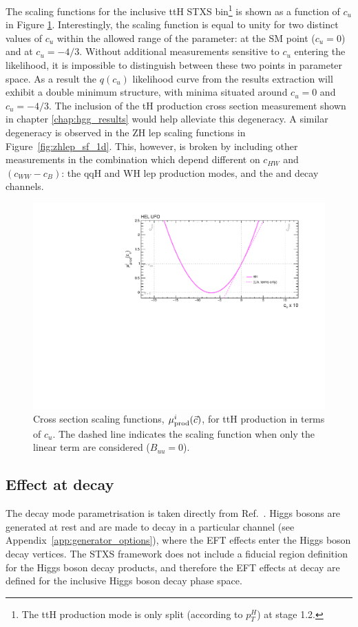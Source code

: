 The scaling functions for the inclusive ttH STXS bin\footnote{The ttH production mode is only split (according to $p_T^H$) at stage 1.2.} is shown as a function of $c_u$ in Figure \ref{fig:tth_sf_1d}. Interestingly, the scaling function is equal to unity for two distinct values of $c_u$ within the allowed range of the parameter: at the SM point ($c_u=0$) and at $c_u=-4/3$. Without additional measurements sensitive to $c_u$ entering the likelihood, it is impossible to distinguish between these two points in parameter space. As a result the $q(c_u)$ likelihood curve from the results extraction will exhibit a double minimum structure, with minima situated around $c_u=0$ and $c_u=-4/3$. The inclusion of the tH production cross section measurement shown in chapter \ref{chap:hgg_results} would help alleviate this degeneracy. A similar degeneracy is observed in the ZH lep scaling functions in Figure~\ref{fig:zhlep_sf_1d}. This, however, is broken by including other measurements in the combination which depend different on $c_{HW}$ and $(c_{WW}-c_B)$: the qqH and WH lep production modes, and the \HZZ and \HWW decay channels.

\begin{figure}[htb!]
  \centering
  \includegraphics[width=.7\textwidth]{Figures/eft/scaling_functions/ttH_vs_cu.pdf}
  \caption[HEL cross section scaling function for ttH STXS bin]
  {
    Cross section scaling functions, $\mu_{\rm{prod}}^i(\vec{c})$, for ttH production in terms of $c_{u}$. The dashed line indicates the scaling function when only the linear term are considered ($B_{uu}=0$).
  }
  \label{fig:tth_sf_1d}
\end{figure}


\subsection{Effect at decay}
The decay mode parametrisation is taken directly from Ref.~\cite{Hays:2673969}. Higgs bosons are generated at rest and are made to decay in a particular channel (see Appendix~\ref{app:generator_options}), where the EFT effects enter the Higgs boson decay vertices. The STXS framework does not include a fiducial region definition for the Higgs boson decay products, and therefore the EFT effects at decay are defined for the inclusive Higgs boson decay phase space. 

